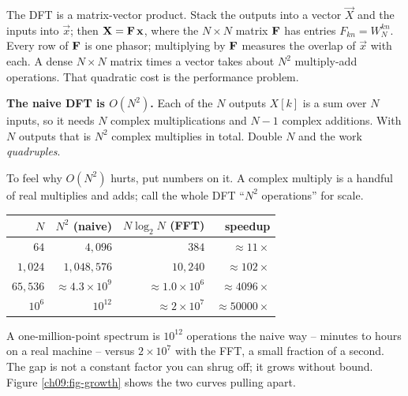 \begin{intuitionbox}
The DFT is a matrix-vector product. Stack the outputs into a vector
$\vec{X}$ and the inputs into $\vec{x}$; then $\mathbf{X} = \mathbf{F}\,\mathbf{x}$, where the
$N\times N$ matrix $\mathbf{F}$ has entries $F_{kn} = W_N^{kn}$. Every row of $\mathbf{F}$ is
one phasor; multiplying by $\mathbf{F}$ measures the overlap of $\vec{x}$ with each. A
dense $N\times N$ matrix times a vector takes about $N^2$ multiply-add operations. That
quadratic cost is the performance problem.
\end{intuitionbox}

\begin{focusbox}
\textbf{The naive DFT is $O(N^2)$.} Each of the $N$ outputs $X[k]$ is a sum over $N$
inputs, so it needs $N$ complex multiplications and $N-1$ complex additions. With $N$
outputs that is $N^2$ complex multiplies in total. Double $N$ and the work
\emph{quadruples}.
\end{focusbox}

To feel why $O(N^2)$ hurts, put numbers on it. A complex multiply is a handful of real
multiplies and adds; call the whole DFT ``$N^2$ operations'' for scale.

\begin{center}
\begin{tabular}{r r r r}
\toprule
$N$ & $N^2$ (naive) & $N\log_2 N$ (FFT) & speedup \\
\midrule
$64$       & $4{,}096$        & $384$           & $\approx 11\times$ \\
$1{,}024$  & $1{,}048{,}576$  & $10{,}240$      & $\approx 102\times$ \\
$65{,}536$ & $\approx 4.3\times 10^{9}$ & $\approx 1.0\times 10^{6}$ & $\approx 4096\times$ \\
$10^{6}$   & $10^{12}$        & $\approx 2\times 10^{7}$ & $\approx 50000\times$ \\
\bottomrule
\end{tabular}
\end{center}

A one-million-point spectrum is $10^{12}$ operations the naive way -- minutes to hours on
a real machine -- versus $2\times10^{7}$ with the FFT, a small fraction of a second. The
gap is not a constant factor you can shrug off; it grows without bound. Figure
\ref{ch09:fig-growth} shows the two curves pulling apart.

